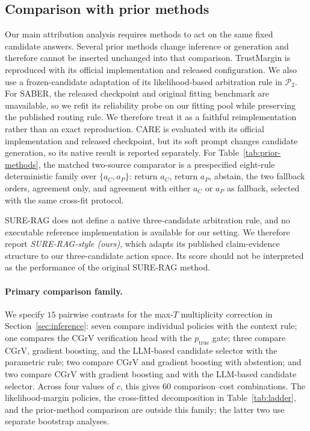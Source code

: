 \documentclass[sigconf]{acmart}
\newcommand{\CGrV}{CGrV}
\newcommand{\ac}{a_C}
\newcommand{\ap}{a_P}
\begin{document}
\subsection{Comparison with prior methods}
\label{sec:prior-methods}

Our main attribution analysis requires methods to act on the same fixed
candidate answers. Several prior methods change inference or generation
and therefore cannot be inserted unchanged into that comparison.
TrustMargin is reproduced with its official implementation and released
configuration. We also use a frozen-candidate adaptation of its
likelihood-based arbitration rule in $\mathcal P_2$. 
For SABER, the released checkpoint and original fitting benchmark are
unavailable, so we refit its reliability probe on our fitting pool while
preserving the published routing rule. We therefore treat it as a
faithful reimplementation rather than an exact reproduction. CARE is
evaluated with its official implementation and released checkpoint, but
its soft prompt changes candidate generation, so its native result is
reported separately. For Table~\ref{tab:prior-methods}, the matched
two-source comparator is a prespecified eight-rule deterministic family
over $\{\ac,\ap\}$: return $\ac$, return $\ap$, abstain, the two fallback
orders, agreement only, and agreement with either $\ac$ or $\ap$ as
fallback, selected with the same cross-fit protocol.

SURE-RAG does not define a native three-candidate arbitration rule,
and no executable reference implementation is available for our
setting. We therefore report \emph{SURE-RAG-style (ours)}, which
adapts its published claim-evidence structure to our three-candidate
action space. Its score should not be interpreted as the performance
of the original SURE-RAG method.



\paragraph{Primary comparison family.}
We specify $15$ pairwise contrasts for the max-$T$ multiplicity
correction in Section~\ref{sec:inference}: seven compare individual
policies with the context rule; one compares the CGrV verification head
with the $p_{\mathrm{true}}$ gate; three compare \CGrV{}, gradient
boosting, and the LLM-based candidate selector with the parametric
rule; two compare \CGrV{} and gradient boosting with abstention; and
two compare \CGrV{} with gradient boosting and with the LLM-based
candidate selector. Across four values of $c$, this gives $60$
comparison--cost combinations. The likelihood-margin policies, the
cross-fitted decomposition in Table~\ref{tab:ladder}, and the
prior-method comparison are outside this family; the latter two use
separate bootstrap analyses.
\end{document}
